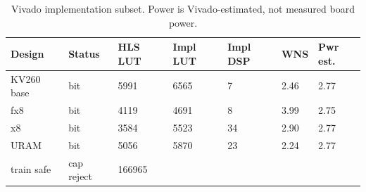 \begin{table}[t]
\centering
\scriptsize
\setlength{\tabcolsep}{3pt}
\begin{tabular}{lllllll}
\hline
Design & Status & HLS LUT & Impl LUT & Impl DSP & WNS & Pwr est. \\
\hline
KV260 base & bit & 5991 & 6565 & 7 & 2.46 & 2.77 \\
fx8 & bit & 4119 & 4691 & 8 & 3.99 & 2.75 \\
x8 & bit & 3584 & 5523 & 34 & 2.90 & 2.77 \\
URAM & bit & 5056 & 5870 & 23 & 2.24 & 2.77 \\
train safe & cap reject & 166965 &  &  &  &  \\
\hline
\end{tabular}
\caption{Vivado implementation subset. Power is Vivado-estimated, not measured board power.}
\label{tab:table\_arxiv\_vivado\_subset}
\end{table}
